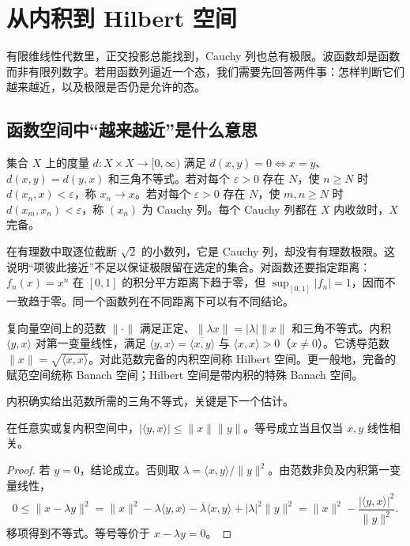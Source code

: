 \chapter{从内积到 Hilbert 空间}
\label{chap:math-hilbert}

有限维线性代数里，正交投影总能找到，Cauchy 列也总有极限。波函数却是函数而非有限列数字。若用函数列逼近一个态，我们需要先回答两件事：怎样判断它们越来越近，以及极限是否仍是允许的态。

\section{函数空间中“越来越近”是什么意思}

\begin{definition}[度量、收敛与完备]
集合 \(X\) 上的度量 \(d:X\times X\to[0,\infty)\) 满足 \(d(x,y)=0\iff x=y\)、\(d(x,y)=d(y,x)\) 和三角不等式。若对每个 \(\varepsilon>0\) 存在 \(N\)，使 \(n\ge N\) 时 \(d(x_n,x)<\varepsilon\)，称 \(x_n\to x\)。若对每个 \(\varepsilon>0\) 存在 \(N\)，使 \(m,n\ge N\) 时 \(d(x_m,x_n)<\varepsilon\)，称 \((x_n)\) 为 Cauchy 列。每个 Cauchy 列都在 \(X\) 内收敛时，\(X\) 完备。
\end{definition}

在有理数中取逐位截断 \(\sqrt2\) 的小数列，它是 Cauchy 列，却没有有理数极限。这说明“项彼此接近”不足以保证极限留在选定的集合。对函数还要指定距离：\(f_n(x)=x^n\) 在 \([0,1]\) 的积分平方距离下趋于零，但 \(\sup_{[0,1]}|f_n|=1\)，因而不一致趋于零。同一个函数列在不同距离下可以有不同结论。

\begin{definition}
复向量空间上的范数 \(\|\cdot\|\) 满足正定、\(\|\lambda x\|=|\lambda|\|x\|\) 和三角不等式。内积 \(\langle y,x\rangle\) 对第一变量线性，满足 \(\langle y,x\rangle=\overline{\langle x,y\rangle}\) 与 \(\langle x,x\rangle>0\)（\(x\ne0\)）。它诱导范数 \(\|x\|=\sqrt{\langle x,x\rangle}\)。对此范数完备的内积空间称 Hilbert 空间。更一般地，完备的赋范空间统称 Banach 空间；Hilbert 空间是带内积的特殊 Banach 空间。
\end{definition}

内积确实给出范数所需的三角不等式，关键是下一个估计。

\begin{theorem}
在任意实或复内积空间中，\(|\langle y,x\rangle|\le\|x\|\|y\|\)。等号成立当且仅当 \(x,y\) 线性相关。
\end{theorem}
\begin{proof}
若 \(y=0\)，结论成立。否则取 \(\lambda=\langle x,y\rangle/\|y\|^2\)。由范数非负及内积第一变量线性，
\[
0\le\|x-\lambda y\|^2
=\|x\|^2-\lambda\langle y,x\rangle
-\overline\lambda\langle x,y\rangle+|\lambda|^2\|y\|^2
=\|x\|^2-\frac{|\langle y,x\rangle|^2}{\|y\|^2}.
\]
移项得到不等式。等号等价于 \(x-\lambda y=0\)。
\end{proof}

